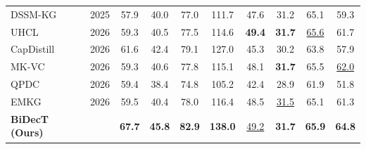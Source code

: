 \begin{table}[!t]
\begin{tabular}{l c cccc cccc}
DSSM-KG~\cite{sunDSSMKGDualStreamStateSpace2025} & 2025 & 57.9 & 40.0 & 77.0 & 111.7 & 47.6 & 31.2 & 65.1 & 59.3 \\
UHCL~\cite{sunUnifiedHierarchicalContrastive2026} & 2026 & 59.3 & 40.5 & 77.5 & 114.6 & \textbf{49.4} & \textbf{31.7} & \underline{65.6} & 61.7 \\
CapDistill~\cite{luoDualhierarchicalKnowledgeDistillation2026} & 2026 & 61.6 & 42.4 & 79.1 & 127.0 & 45.3 & 30.2 & 63.8 & 57.9 \\
MK-VC~\cite{sunSceneAdaptiveDynamic2026} & 2026 & 59.3 & 40.6 & 77.8 & 115.1 & 48.1 & \textbf{31.7} & 65.5 & \underline{62.0} \\
QPDC~\cite{chenAskFocusMore2026} & 2026 & 59.4 & 38.4 & 74.8 & 105.2 & 42.4 & 28.9 & 61.9 & 51.8 \\
EMKG~\cite{sunGeneralizedVideoCaptioning2026} & 2026 & 59.5 & 40.4 & 78.0 & 116.4 & 48.5 & \underline{31.5} & 65.1 & 61.3 \\
\hline
\textbf{BiDecT (Ours)} & & \textbf{67.7} & \textbf{45.8} & \textbf{82.9} & \textbf{138.0} & \underline{49.2} & \textbf{31.7} & \textbf{65.9} & \textbf{64.8} \\
\hline\hline
\end{tabular}
\end{table}

